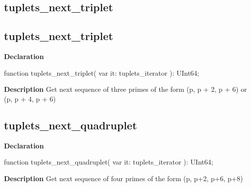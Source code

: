 \documentclass{report}
\newif\ifpdf
\begin{document}
\subsection*{\large{\textbf{tuplets{\_}next{\_}triplet}}\normalsize\hspace{1ex}\hrulefill}
\else
\subsection*{tuplets{\_}next{\_}triplet}
\fi
\label{primesieve-tuplets_next_triplet}
\begin{list}{}{
\setlength{\itemindent}{0cm}
\setlength{\listparindent}{0cm}
\setlength{\leftmargin}{\evensidemargin}
\addtolength{\leftmargin}{\tmplength}
\settowidth{\labelsep}{X}
\addtolength{\leftmargin}{\labelsep}
\setlength{\labelwidth}{\tmplength}
}
\item[\textbf{Declaration}\hfill]
\ifpdf
\begin{flushleft}
\fi
\begin{ttfamily}
function tuplets{\_}next{\_}triplet( var it: tuplets{\_}iterator ): UInt64;\end{ttfamily}

\ifpdf
\end{flushleft}
\fi

\par
\item[\textbf{Description}]
Get next sequence of three primes of the form (p, p + 2, p + 6) or (p, p + 4, p + 6)

\end{list}
\ifpdf
\subsection*{\large{\textbf{tuplets{\_}next{\_}quadruplet}}\normalsize\hspace{1ex}\hrulefill}
\else
\subsection*{tuplets{\_}next{\_}quadruplet}
\fi
\label{primesieve-tuplets_next_quadruplet}
\begin{list}{}{
\setlength{\itemindent}{0cm}
\setlength{\listparindent}{0cm}
\setlength{\leftmargin}{\evensidemargin}
\addtolength{\leftmargin}{\tmplength}
\settowidth{\labelsep}{X}
\addtolength{\leftmargin}{\labelsep}
\setlength{\labelwidth}{\tmplength}
}
\item[\textbf{Declaration}\hfill]
\ifpdf
\begin{flushleft}
\fi
\begin{ttfamily}
function tuplets{\_}next{\_}quadruplet( var it: tuplets{\_}iterator ): UInt64;\end{ttfamily}

\ifpdf
\end{flushleft}
\fi

\par
\item[\textbf{Description}]
Get next sequence of four primes of the form (p, p+2, p+6, p+8)

\end{list}
\ifpdf
\end{document}
